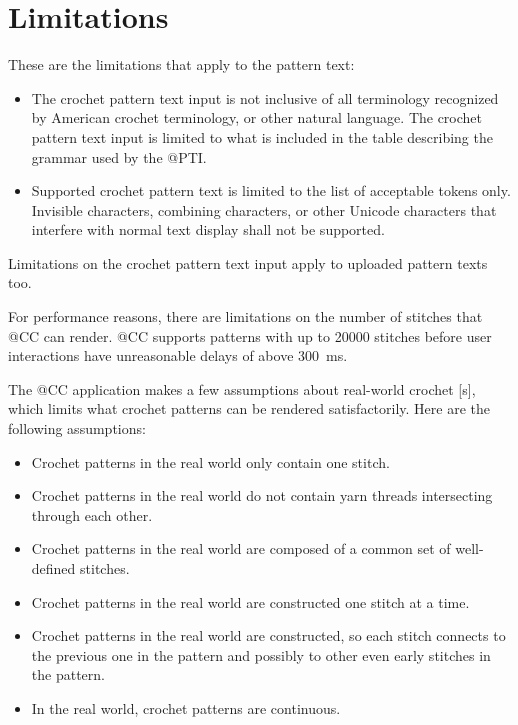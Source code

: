 \documentclass[main.tex]{subfiles}
\begin{document}
\chapter{Limitations}\label{chp:limitations}

These are the limitations that apply to the pattern text:
\begin{itemize}
\item The crochet pattern text input is not inclusive of all terminology recognized by American crochet terminology, or other natural language. The crochet pattern text input is limited to what is included in the table describing the grammar used by the @PTI.
\item Supported crochet pattern text is limited to the list of acceptable tokens only. Invisible characters, combining characters, or other Unicode characters that interfere with normal text display shall not be supported.
\end{itemize}

Limitations on the crochet pattern text input apply to uploaded pattern texts too.

For performance reasons, there are limitations on the number of stitches that @CC can render. @CC supports patterns with up to \num{20000} stitches before user interactions have unreasonable delays of above \qty{300}{ms}. 

The @CC application makes a few assumptions about real-world crochet [s], which limits what crochet patterns can be rendered satisfactorily. Here are the following assumptions:

\begin{itemize}
\item Crochet patterns in the real world only contain one  stitch.
\item Crochet patterns in the real world do not contain yarn threads intersecting through each other.
\item Crochet patterns in the real world are composed of a common set of well-defined stitches.
\item Crochet patterns in the real world are constructed one stitch at a time.
\item Crochet patterns in the real world are constructed, so each stitch connects to the previous one in the pattern and possibly to other even early stitches in the pattern.
\item In the real world, crochet patterns are continuous.
\end{itemize}
\end{document}
